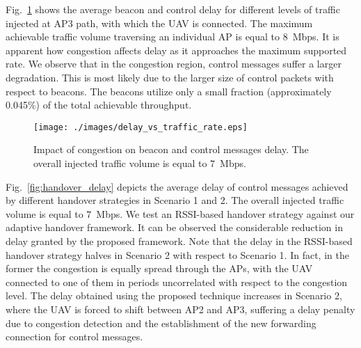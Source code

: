 Fig.~\ref{fig:delay_traffic} shows the average beacon and control delay for different levels of traffic injected at AP3 path, with which the UAV is connected. The maximum achievable traffic volume traversing an individual AP is equal to $8$~Mbps. It is apparent how congestion affects delay as it approaches the maximum supported rate. We observe that in the congestion region, control messages suffer a larger degradation. This is most likely due to the larger size of control packets with respect to beacons. The beacons utilize only a small fraction (approximately 0.045\%) of the total achievable throughput.

\begin{figure}[!t]
\centering   \texttt{[image: ./images/delay\_vs\_traffic\_rate.eps]}
\vspace{-2mm}
\caption{Impact of congestion on beacon and control messages delay. The overall injected traffic volume is equal to $7$~Mbps.}
\vspace{-2mm}
\label{fig:delay_traffic}
\end{figure}



Fig.~\ref{fig:handover_delay} depicts the average delay of control messages achieved by different handover strategies in Scenario 1 and 2. The overall injected traffic volume is equal to $7$~Mbps. We test an RSSI-based handover strategy against our adaptive handover framework. It can be observed the considerable reduction in delay granted by the proposed framework. Note that the delay in the RSSI-based handover strategy halves in Scenario 2 with respect to Scenario 1. In fact, in the former the congestion is equally spread through the APs, with the UAV connected to one of them in periods uncorrelated with respect to the congestion level. The delay obtained using the proposed technique increases in Scenario 2, where the UAV is forced to shift between AP2 and AP3, suffering a delay penalty due to congestion detection and the establishment of the new forwarding connection for control messages.


